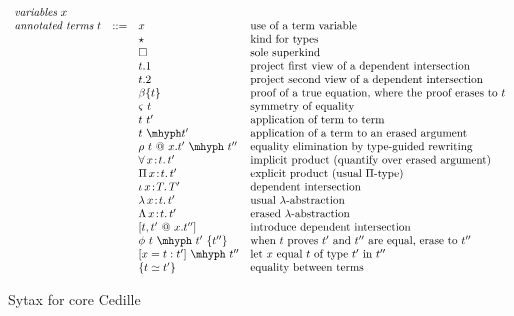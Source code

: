 \documentclass{article}
\newcommand{\abs}[4]{{#1}\, #2\! : \! #3.\, #4}
\begin{document}
\begin{figure}
\[
\begin{array}{llll}
  \textit{variables}\ x & \ & \ &\ \\
  \textit{annotated terms}\ t & ::= & x\ & \textnormal{use of a term variable} \\
  \ &\ & \star&\textnormal{kind for types}\\
  \ &\ & \Box&\textnormal{sole superkind} \\
  \ &\ & t.1 & \textnormal{project first view of a dependent intersection}\\
  \ &\ & t.2 & \textnormal{project second view of a dependent intersection}\\
  \ &\ & \beta\{t\} &\textnormal{proof of a true equation, where the proof erases to }t  \\
  \ &\ & \varsigma\ t &\textnormal{symmetry of equality}  \\
  \ &\ & t\ t' & \textnormal{application of term to term}\\
  \ &\ & t\ \mhyph t' & \textnormal{application of a term to an erased argument}\\
  \ &\ & \rho\ t\ @\ x.t'\ \mhyph\ t''&\textnormal{equality elimination by type-guided rewriting}  \\ 
  \ &\ & \abs{\forall}{x}{t}{t'}\ &\textnormal{implicit product (quantify over erased argument)} \\
  \ &\ & \abs{\Pi}{x}{t}{t'}\ &\textnormal{explicit product (usual }\Pi\textnormal{-type)} \\
  \ &\ & \abs{\iota}{x}{T}{T'}\ &\textnormal{dependent intersection} \\
  \ &\ & \abs{\lambda}{x}{t}{t'} & \textnormal{usual }\lambda\textnormal{-abstraction} \\
  \ &\ & \abs{\Lambda}{x}{t}{t'} & \textnormal{erased }\lambda\textnormal{-abstraction}\\
  \ &\ & [ t , t' \ @\ x.t'' ] & \textnormal{introduce dependent intersection}\\
  \ &\ & \phi\ t\ \mhyph\ t'\ \{t''\} & \textnormal{when }t\textnormal{ proves }t'\textnormal{ and }t''
                                   \textnormal{ are equal, erase to }t'' \\
  \ & \ & [ x = t : t' ]\ \mhyph\ t'' & \textnormal{let }x\textnormal{ equal }t\textnormal{ of type }t'\textnormal{ in }t'' \\
  \ &\ & \{ t \simeq t' \} &\textnormal{equality between terms}
\end{array}
  \]
  \caption{Sytax for core Cedille}
  \label{fig:syntax}
\end{figure}
\end{document}
